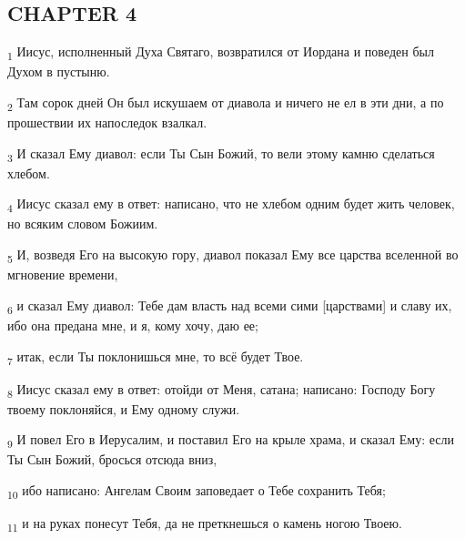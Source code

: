 \subsection{CHAPTER 4}
\begin{tcolorbox}
\textsubscript{1} Иисус, исполненный Духа Святаго, возвратился от Иордана и поведен был Духом в пустыню.
\end{tcolorbox}
\begin{tcolorbox}
\textsubscript{2} Там сорок дней Он был искушаем от диавола и ничего не ел в эти дни, а по прошествии их напоследок взалкал.
\end{tcolorbox}
\begin{tcolorbox}
\textsubscript{3} И сказал Ему диавол: если Ты Сын Божий, то вели этому камню сделаться хлебом.
\end{tcolorbox}
\begin{tcolorbox}
\textsubscript{4} Иисус сказал ему в ответ: написано, что не хлебом одним будет жить человек, но всяким словом Божиим.
\end{tcolorbox}
\begin{tcolorbox}
\textsubscript{5} И, возведя Его на высокую гору, диавол показал Ему все царства вселенной во мгновение времени,
\end{tcolorbox}
\begin{tcolorbox}
\textsubscript{6} и сказал Ему диавол: Тебе дам власть над всеми сими [царствами] и славу их, ибо она предана мне, и я, кому хочу, даю ее;
\end{tcolorbox}
\begin{tcolorbox}
\textsubscript{7} итак, если Ты поклонишься мне, то всё будет Твое.
\end{tcolorbox}
\begin{tcolorbox}
\textsubscript{8} Иисус сказал ему в ответ: отойди от Меня, сатана; написано: Господу Богу твоему поклоняйся, и Ему одному служи.
\end{tcolorbox}
\begin{tcolorbox}
\textsubscript{9} И повел Его в Иерусалим, и поставил Его на крыле храма, и сказал Ему: если Ты Сын Божий, бросься отсюда вниз,
\end{tcolorbox}
\begin{tcolorbox}
\textsubscript{10} ибо написано: Ангелам Своим заповедает о Тебе сохранить Тебя;
\end{tcolorbox}
\begin{tcolorbox}
\textsubscript{11} и на руках понесут Тебя, да не преткнешься о камень ногою Твоею.
\end{tcolorbox}
